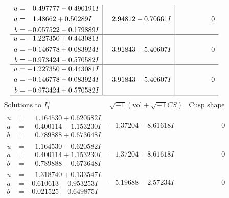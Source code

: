\documentclass[1p]{elsarticle_modified}
\theoremstyle{definition}
\newcommand{\I}{\sqrt{-1}}
\begin{document}
$$\begin{array}{c|c|c}
\begin{aligned}
u &= \phantom{-}0.497777 - 0.490191 I \\
a &= \phantom{-}1.48662 + 0.50289 I \\
b &= -0.057522 - 0.179889 I\end{aligned}
 & \phantom{-}2.94812 - 0.70661 I & \phantom{-0.000000 } 0 \\ \hline\begin{aligned}
u &= -1.227350 + 0.443081 I \\
a &= -0.146778 + 0.083924 I \\
b &= -0.973424 - 0.570582 I\end{aligned}
 & -3.91843 + 5.40607 I & \phantom{-0.000000 } 0 \\ \hline\begin{aligned}
u &= -1.227350 - 0.443081 I \\
a &= -0.146778 - 0.083924 I \\
b &= -0.973424 + 0.570582 I\end{aligned}
 & -3.91843 - 5.40607 I & \phantom{-0.000000 } 0\\
 \hline 
 \end{array}$$\newpage$$\begin{array}{c|c|c}  
\text{Solutions to }I^u_{1}& \I (\text{vol} + \sqrt{-1}CS) & \text{Cusp shape}\\
 \hline 
\begin{aligned}
u &= \phantom{-}1.164530 + 0.620582 I \\
a &= \phantom{-}0.400114 - 1.153230 I \\
b &= \phantom{-}0.789888 + 0.673648 I\end{aligned}
 & -1.37204 - 8.61618 I & \phantom{-0.000000 } 0 \\ \hline\begin{aligned}
u &= \phantom{-}1.164530 - 0.620582 I \\
a &= \phantom{-}0.400114 + 1.153230 I \\
b &= \phantom{-}0.789888 - 0.673648 I\end{aligned}
 & -1.37204 + 8.61618 I & \phantom{-0.000000 } 0 \\ \hline\begin{aligned}
u &= \phantom{-}1.318740 + 0.133547 I \\
a &= -0.610613 - 0.953253 I \\
b &= -0.021525 - 0.649875 I\end{aligned}
 & -5.19688 - 2.57234 I & \phantom{-0.000000 } 0 \\ \hline\begin{aligned}

\end{aligned}
\end{array}$$
\end{document}
